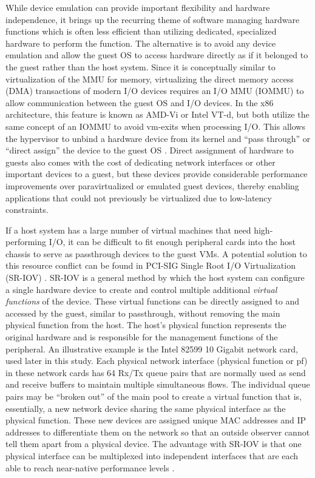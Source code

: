 While device emulation can provide important flexibility and hardware independence, it brings up the recurring theme of software managing hardware functions which is often less efficient than utilizing dedicated, specialized hardware to perform the function.
The alternative is to avoid any device emulation and allow the guest OS to access hardware directly as if it belonged to the guest rather than the host system.
Since it is conceptually similar to virtualization of the MMU for memory, virtualizing the direct memory access (DMA) transactions of modern I/O devices requires an I/O MMU (IOMMU) to allow communication between the guest OS and I/O devices.
In the x86 architecture, this feature is known as AMD-Vi or Intel VT-d, but both utilize the same concept of an IOMMU to avoid vm-exits when processing I/O.
This allows the hypervisor to unbind a hardware device from its kernel and ``pass through'' or ``direct assign'' the device to the guest OS \autocite{_jones_1}.
Direct assignment of hardware to guests also comes with the cost of dedicating network interfaces or other important devices to a guest, but these devices provide considerable performance improvements over paravirtualized or emulated guest devices, thereby enabling applications that could not previously be virtualized due to low-latency constraints.

If a host system has a large number of virtual machines that need high-performing I/O, it can be difficult to fit enough peripheral cards into the host chassis to serve as passthrough devices to the guest VMs.
A potential solution to this resource conflict can be found in PCI-SIG Single Root I/O Virtualization (SR-IOV) \autocite{_pcisig_1, intelvtd}.
SR-IOV is a general method by which the host system can configure a single hardware device to create and control multiple additional \emph{virtual functions} of the device.
These virtual functions can be directly assigned to and accessed by the guest, similar to passthrough, without removing the main physical function from the host.
The host's physical function represents the original hardware and is responsible for the management functions of the peripheral.  
An illustrative example is the Intel 82599 10 Gigabit network card, used later in this study.
Each physical network interface (physical function or pf) in these network cards has 64 Rx/Tx queue pairs that are normally used as send and receive buffers to maintain multiple simultaneous flows.
The individual queue pairs may be ``broken out'' of the main pool to create a virtual function that is, essentially, a new network device sharing the same physical interface as the physical function.
These new devices are assigned unique MAC addresses and IP addresses to differentiate them on the network so that an outside observer cannot tell them apart from a physical device.
The advantage with SR-IOV is that one physical interface can be multiplexed into independent interfaces that are each able to reach near-native performance levels \autocite{_nasa_1}.

